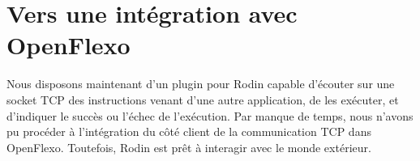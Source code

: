 \section*{Vers une intégration avec OpenFlexo}

Nous disposons maintenant d'un plugin pour Rodin capable d'écouter sur une socket TCP des instructions venant d'une autre application, de les exécuter, et d'indiquer %
le succès ou l'échec de l'exécution.
Par manque de temps, nous n'avons pu procéder à l'intégration du côté client de la communication TCP dans OpenFlexo.
Toutefois, Rodin est prêt à interagir avec le monde extérieur.
